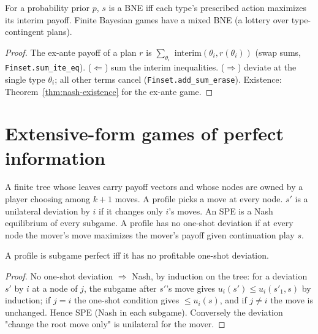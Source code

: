\begin{theorem}
\label{thm:bne}
\leanok
{}
For a probability prior $p$, $s$ is a BNE iff each type's prescribed action maximizes its interim payoff.
Finite Bayesian games have a mixed BNE (a lottery over type-contingent plans).
\end{theorem}
\begin{proof}
\leanok
The ex-ante payoff of a plan $r$ is $\sum_{\theta_i}$ interim$(\theta_i, r(\theta_i))$ (swap sums,
\texttt{Finset.sum\_ite\_eq}). ($\Leftarrow$) sum the interim inequalities. ($\Rightarrow$) deviate at the single
type $\theta_i$; all other terms cancel (\texttt{Finset.add\_sum\_erase}). Existence: Theorem~\ref{thm:nash-existence}
for the ex-ante game.
\end{proof}

\section{Extensive-form games of perfect information}
\label{sec:extensive}

\begin{definition}
\label{def:game-tree}
\leanok
A finite tree whose leaves carry payoff vectors and whose nodes are owned by a player choosing among $k+1$ moves.
A profile picks a move at every node. $s'$ is a unilateral deviation by $i$ if it changes only $i$'s moves. An
SPE is a Nash equilibrium of every subgame. A profile has no one-shot deviation if at every node the mover's move
maximizes the mover's payoff given continuation play $s$.
\end{definition}

\begin{theorem}
\label{thm:one-shot}
\leanok
{}
A profile is subgame perfect iff it has no profitable one-shot deviation.
\end{theorem}
\begin{proof}
\leanok
No one-shot deviation $\Rightarrow$ Nash, by induction on the tree: for a deviation $s'$ by $i$ at a node of $j$,
the subgame after $s'$'s move gives $u_i(s') \le u_i(s'_1, s)$ by induction; if $j = i$ the one-shot condition
gives $\le u_i(s)$, and if $j \ne i$ the move is unchanged. Hence SPE (Nash in each subgame). Conversely the
deviation "change the root move only" is unilateral for the mover.
\end{proof}

